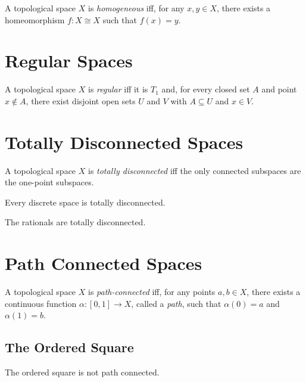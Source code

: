 \begin{df}[Homogeneous]
A topological space $X$ is \emph{homogeneous} iff, for any $x,y \in X$, there exists a homeomorphism $f : X \cong X$ such that $f(x) = y$.
\end{df}

\section{Regular Spaces}

\begin{df}[Regular]
A topological space $X$ is \emph{regular} iff it is $T_1$ and, for every closed set $A$ and point $x \notin A$, there exist disjoint open sets $U$ and $V$ with $A \subseteq U$ and $x \in V$.
\end{df}

\section{Totally Disconnected Spaces}

\begin{df}
A topological space $X$ is \emph{totally disconnected} iff the only connected subspaces are the one-point subspaces.
\end{df}

\begin{ex}
Every discrete space is totally disconnected.
\end{ex}

\begin{ex}
The rationals are totally disconnected.
\end{ex}

\section{Path Connected Spaces}

\begin{df}
A topological space $X$ is \emph{path-connected} iff, for any points $a,b \in X$, there exists a continuous function $\alpha : [0,1] \rightarrow X$, called a \emph{path}, such that $\alpha(0) = a$ and $\alpha(1) = b$.
\end{df}

\subsection{The Ordered Square}

\begin{prop}
The ordered square is not path connected.
\end{prop}


